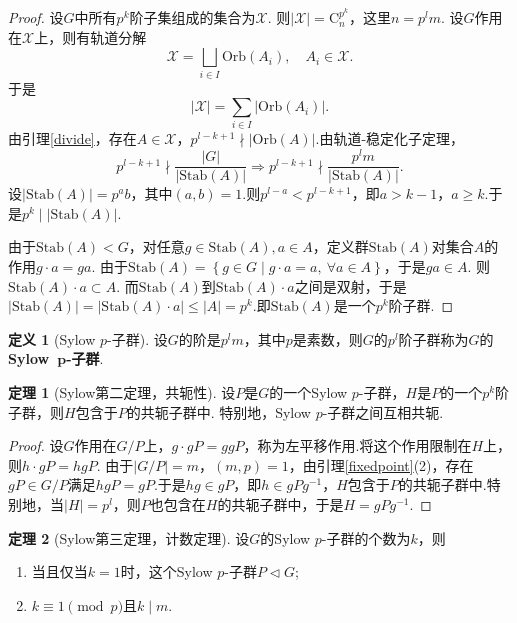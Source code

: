 \documentclass[12pt]{ctexart}
\theoremstyle{definition}
\newtheorem{definition}{定义}
\newtheorem{theorem}{定理}
\theoremstyle{plain}
\newcommand{\Orb}{\mathrm{Orb}}
\newcommand{\Stab}{\mathrm{Stab}}
\begin{document}
	\begin{proof}
		设$G$中所有$p^k$阶子集组成的集合为$\mathcal{X}$. 则$|\mathcal{X}|=\mathrm{C}_{n}^{p^k}$，这里$n=p^lm$.
		设$G$作用在$\mathcal{X}$上，则有轨道分解
		$$\mathcal{X}=\bigsqcup_{i\in I}\Orb(A_i),\quad A_i\in\mathcal{X}.$$
		于是
		$$|\mathcal{X}|=\sum_{i\in I}|\Orb(A_i)|.$$
		由引理\ref{divide}，存在$A\in\mathcal{X}$，$p^{l-k+1}\nmid|\Orb(A)|$.由轨道-稳定化子定理，
		$$p^{l-k+1}\nmid \frac{|G|}{|\Stab(A)|}\Rightarrow p^{l-k+1}\nmid\frac{p^lm}{|\Stab(A)|}.$$
		设$|\Stab(A)|=p^ab$，其中$(a,b)=1$.则$p^{l-a}<p^{l-k+1}$，即$a>k-1$，$a\geqslant k$.于是$p^k\mid|\Stab(A)|$.
		
		由于$\Stab(A)<G$，对任意$g\in\Stab(A),a\in A$，定义群$\Stab(A)$对集合$A$的作用$g\cdot a=ga$. 由于$\Stab(A)=\left\{g\in G\mid g\cdot a=a,\ \forall a\in A\right\}$，于是$ga\in A$. 则$\Stab(A)\cdot a\subset A$. 而$\Stab(A)$到$\Stab(A)\cdot a$之间是双射，于是$|\Stab(A)|=|\Stab(A)\cdot a|\leqslant|A|=p^k$.即$\Stab(A)$是一个$p^k$阶子群.
	\end{proof}
	\begin{definition}[Sylow $p$-子群]
	设$G$的阶是$p^lm$，其中$p$是素数，则$G$的$p^l$阶子群称为$G$的\textbf{Sylow\ $\boldsymbol{p}$-子群}.
	\end{definition}
	\begin{theorem}[Sylow第二定理，共轭性]
		设$P$是$G$的一个Sylow $p$-子群，$H$是$P$的一个$p^k$阶子群，则$H$包含于$P$的共轭子群中. 特别地，Sylow $p$-子群之间互相共轭.
	\end{theorem}
	\begin{proof}
		设$G$作用在$G/P$上，$g\cdot gP=ggP$，称为左平移作用.将这个作用限制在$H$上，则$h\cdot gP=hgP$. 由于$|G/P|=m$，$(m,p)=1$，由引理\ref{fixedpoint}(2)，存在$gP\in G/P$满足$hgP=gP$.于是$hg\in gP$，即$h\in gPg^{-1}$，$H$包含于$P$的共轭子群中.特别地，当$|H|=p^l$，则$P$也包含在$H$的共轭子群中，于是$H=gPg^{-1}$.
	\end{proof}
	\begin{theorem}[Sylow第三定理，计数定理]
		设$G$的Sylow $p$-子群的个数为$k$，则
		\begin{enumerate}[(1)]
			\item 当且仅当$k=1$时，这个Sylow $p$-子群$P\lhd G$;
			\item $k\equiv 1\pmod p$且$k\mid m$.
		\end{enumerate}
	\end{theorem}
\end{document}
